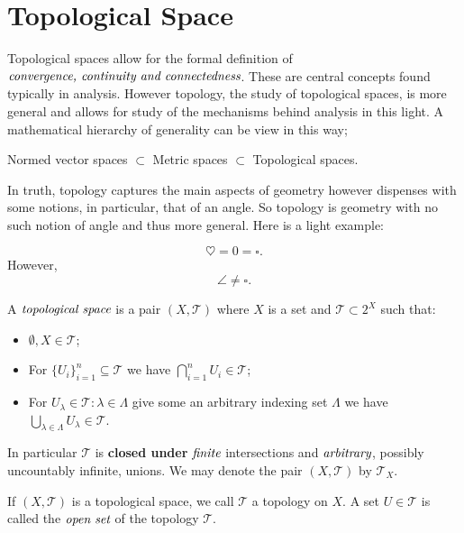 
\section{Topological Space} %
\label{sec:topologicalspace}

Topological spaces allow for the formal definition of
$\emph{convergence, continuity and connectedness}$.
These are central concepts found typically in analysis.
However topology, the study of topological spaces, is more
general and allows for study of the mechanisms behind analysis
in this light.
A mathematical hierarchy of generality can be view in this way;
\begin{center}
	Normed vector spaces $\subset$ Metric spaces $\subset$ Topological spaces.
\end{center}

In truth, topology captures the main aspects of geometry however
dispenses with some notions, in particular, that of an angle. So
topology is geometry with no such notion of angle and thus more general.
Here is a light example:

\begin{exmp}
	\[
		\heartsuit = 0 = \square.
	\]
	However,
	\[
		\angle \neq \square.
	\]
\end{exmp}

\begin{defn}
	A $\emph{topological space}$ is a pair $(X, \mathcal{T})$
	where $X$ is a set and $\mathcal{T} \subset 2^{X}$ such that:
	\begin{itemize}
		\item $\emptyset, X \in \mathcal{T}$;
		\item For $\{U_i\}_{i=1}^{n} \subseteq \mathcal{T}$ we have 
			$\displaystyle \bigcap_{i=1}^{n} U_i \in \mathcal{T}$;
		\item For $U_{\lambda} \in \mathcal{T} : \lambda \in \Lambda$ give some
			an arbitrary indexing set $\Lambda$ we have
			$\displaystyle \bigcup_{\lambda \in \Lambda} U_{\lambda} \in \mathcal{T}$.
	\end{itemize}
	In particular $\mathcal{T}$ is \textbf{closed under} $\emph{finite}$ intersections
	and $\emph{arbitrary}$, possibly uncountably infinite, unions. We may denote
	the pair $(X, \mathcal{T})$ by $\mathcal{T}_{X}$.
\end{defn}

If $(X,\mathcal{T})$ is a topological space, we call $\mathcal{T}$
a topology on $X$. A set $U \in \mathcal{T}$ is called the
$\emph{open set}$ of the topology $\mathcal{T}$.


